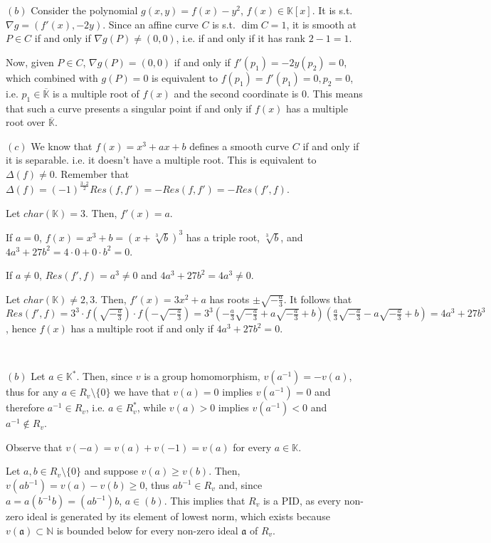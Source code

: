 \documentclass{article}
\newcommand{\numberset}{\mathbb}
\newcommand{\N}{\numberset{N}}
\newcommand{\K}{\numberset{K}}
\newcommand{\aid}{\mathfrak{a}}
\newcommand{\exercise}[1]{\noindent {\bf Exercise #1}}
\begin{document}
$(b)$ Consider the polynomial $g(x,y)=f(x)-y^2$, $f(x)\in\K[x]$. It is s.t. 
$\nabla{g}=(f'(x),-2y)$. Since an affine curve $C$ is s.t. $\dim C=1$, it is 
smooth at $P\in C$ if and only if $\nabla g(P)\neq (0,0)$, i.e. if and only if
it has rank $2-1=1$.

Now, given $P\in C$, $\nabla g(P)=(0,0)$ if and only if $f'(p_1)=-2y(p_2)=0$, 
which combined with $g(P)=0$ is equivalent to $f(p_1)=f'(p_1)=0,p_2=0$, i.e. 
$p_1\in\overline{\K}$ is a multiple root of $f(x)$ and the second coordinate is 0. 
This means that such a curve presents a singular point if and only if $f(x)$ has 
a multiple root over $\overline{\K}$.

$(c)$ We know that $f(x)=x^3+ax+b$ defines a smooth curve $C$ if and only if it 
is separable. i.e. it doesn't have a multiple root. This is equivalent to 
$\Delta(f)\neq 0$. Remember that $\Delta(f)=(-1)^{\frac{3\cdot 2}{2}}Res(f,f')=
-Res(f,f')=-Res(f',f)$.

Let $char(\K)=3$. Then, $f'(x)=a$.

If $a=0$, $f(x)=x^3+b=(x+\sqrt[3]{b})^3$ has a triple
root, $\sqrt[3]{b}$, and $4a^3+27b^2=4\cdot 0+0\cdot b^2=0$.

If $a\neq 0$, $Res(f',f)=a^3\neq 0$ and $4a^3+27b^2=4a^3\neq 0$.

Let $char(\K)\neq 2,3$. Then, $f'(x)=3x^2+a$ has roots $\pm\sqrt{-\frac{a}{3}}$. It 
follows that $Res(f',f)=3^3\cdot f(\sqrt{-\frac{a}{3}})\cdot f(-\sqrt{-\frac{a}{3}})=
3^3(-\frac{a}{3}\sqrt{-\frac{a}{3}}+a\sqrt{-\frac{a}{3}}+b)(\frac{a}{3}
\sqrt{-\frac{a}{3}}-a\sqrt{-\frac{a}{3}}+b)=4a^3+27b^3$, hence $f(x)$ has a multiple 
root if and only if $4a^3+27b^2=0$.


~\\
\exercise{6}

$(b)$ Let $a\in \K^*$. Then, since $v$ is a group homomorphism, $v(a^{-1})=-v(a)$, 
thus for any $a\in R_v\setminus\{0\}$ we have that $v(a)=0$ implies $v(a^{-1})=0$ 
and therefore $a^{-1}\in R_v$, i.e. $a\in R_v^*$, while $v(a)>0$ implies $v(a^{-1})<0$ 
and $a^{-1}\not\in R_v$.

Observe that $v(-a)=v(a)+v(-1)=v(a)$ for every $a\in\K$.

Let $a,b\in R_v\setminus\{0\}$ and suppose $v(a)\geq v(b)$. Then, 
$v(ab^{-1})=v(a)-v(b)\geq 0$, thus $ab^{-1}\in R_v$ and, since 
$a=a(b^{-1}b)=(ab^{-1})b$, $a\in (b)$. This implies that $R_v$ is a PID, as every 
non-zero ideal is generated by its element of lowest norm, which exists because 
$v(\aid)\subset\N$ is bounded below for every non-zero ideal $\aid$ of $R_v$.
\end{document}
